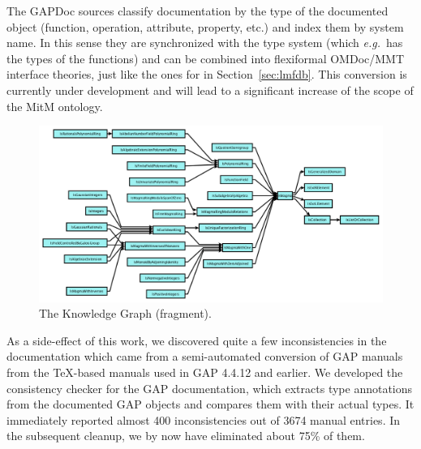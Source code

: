 The GAPDoc sources classify documentation by the type of the documented object (function,
operation, attribute, property, etc.) and index them by system name. In this sense they
are synchronized with the type system (which \emph{e.g.}\ has the types of the functions) and can
be combined into flexiformal OMDoc/MMT interface theories, just like the ones for \LMFDB
in Section~\ref{sec:lmfdb}. This conversion is currently under development and will lead
to a significant increase of the scope of the MitM ontology. 

\begin{figure}[ht]\centering
  \includegraphics[width=\textwidth]{gap-ismagma}
  \caption{The \GAP Knowledge Graph (fragment).\label{fig:gap-ismagma}}
\end{figure}

As a side-effect of this work, we discovered quite a few inconsistencies in the \GAP
documentation which came from a semi-automated conversion of GAP manuals from the
\TeX-based manuals used in GAP 4.4.12 and earlier.  We developed the consistency checker
for the GAP documentation, which extracts type annotations from the documented GAP objects
and compares them with their actual types. It immediately reported almost 400
inconsistencies out of 3674 manual entries. In the subsequent cleanup, we by now have
eliminated about 75\% of them. 


